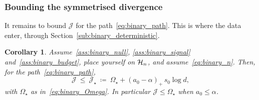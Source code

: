 \documentclass[aos]{imsart}%
\theoremstyle{plain}
\newtheorem{corollary}{Corollary}[section]
\theoremstyle{definition}
\begin{document}
    \subsubsection{Bounding the symmetrised divergence}

    It remains to bound $\mathcal J$ for the path~\eqref{eq:binary_path}. This
    is where the data enter, through
    Section~\ref{sub:binary_deterministic}.

    \begin{corollary}
        \label{cor:binary_J}
        Assume~\ref{ass:binary_null}, \ref{ass:binary_signal}
        and~\ref{ass:binary_budget}, place yourself on $\mathcal{H}_n$, and
        assume~\eqref{eq:binary_n}. Then, for the path~\eqref{eq:binary_path},
        \begin{equation}
            \label{eq:binary_Jstar}
            \mathcal{J}\ \leq\ \mathcal{J}_\star
            \ \coloneq\ \Omega_\star+(a_0-\alpha)_{+}\,s_0\log d ,
        \end{equation}
        with $\Omega_\star$ as in~\eqref{eq:binary_Omega}. In particular
        $\mathcal J\leq\Omega_\star$ when $a_0\leq\alpha$.
    \end{corollary}
\end{document}
